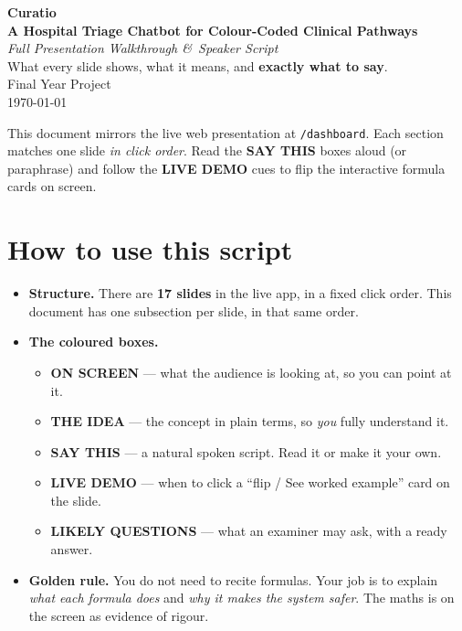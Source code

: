 \documentclass[11pt]{article}
\begin{document}
\begin{titlepage}
\centering
\vspace*{3cm}
{\Huge\bfseries\color{forest} Curatio}\\[0.4cm]
{\LARGE\bfseries A Hospital Triage Chatbot for Colour-Coded Clinical Pathways}\\[1cm]
{\Large\itshape Full Presentation Walkthrough \&\ Speaker Script}\\[0.6cm]
{\large What every slide shows, what it means, and \textbf{exactly what to say}.}\\[2cm]
{\large Final Year Project}\\[0.3cm]
{\large \today}\\[2cm]
\begin{tcolorbox}[width=0.85\textwidth, colback=sand, colframe=forest, arc=4pt]
\small\centering
This document mirrors the live web presentation at \texttt{/dashboard}. Each section matches one
slide \emph{in click order}. Read the \textbf{SAY THIS} boxes aloud (or paraphrase) and follow the
\textbf{LIVE DEMO} cues to flip the interactive formula cards on screen.
\end{tcolorbox}
\end{titlepage}

\tableofcontents
\newpage

\section{How to use this script}

\begin{itemize}
  \item \textbf{Structure.} There are \textbf{17 slides} in the live app, in a fixed click order.
        This document has one subsection per slide, in that same order.
  \item \textbf{The coloured boxes.}
    \begin{itemize}
      \item \textbf{ON SCREEN} --- what the audience is looking at, so you can point at it.
      \item \textbf{THE IDEA} --- the concept in plain terms, so \emph{you} fully understand it.
      \item \textbf{SAY THIS} --- a natural spoken script. Read it or make it your own.
      \item \textbf{LIVE DEMO} --- when to click a ``flip / See worked example'' card on the slide.
      \item \textbf{LIKELY QUESTIONS} --- what an examiner may ask, with a ready answer.
    \end{itemize}
  \item \textbf{Golden rule.} You do not need to recite formulas. Your job is to explain
        \emph{what each formula does} and \emph{why it makes the system safer}. The maths is on the
        screen as evidence of rigour.
\end{itemize}
\end{document}
